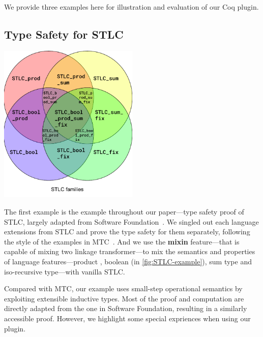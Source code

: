 \newpage{}
We provide three examples here for illustration and evaluation of our Coq plugin. 

\subsection{Type Safety for STLC}
\label{sec:coqexample-stlc}

  \includegraphics[width=0.5\textwidth]{coqexmaple/Mixin-Venn-Diagram.pdf}

The first example is the example throughout our paper---type safety proof of STLC, largely adapted
from Software Foundation~\cite{pierce2014software}. We singled out each language extensions from
STLC and prove the type safety for them separately, following
the style of the examples in MTC~\cite{delaware2013,forsta2020}.
And we use the \textbf{mixin} feature---that is capable of mixing two linkage transformer---to mix the semantics and properties of language features---product
, boolean (in \cref{fig:STLC-example}), sum type and iso-recursive type---with vanilla STLC.



Compared with MTC,
our example uses small-step operational semantics by exploiting
extensible inductive types. Most of the proof and computation are directly adapted from the one in Software Foundation, resulting in a similarly accessible proof. However, we highlight some special expriences when using our plugin. 

